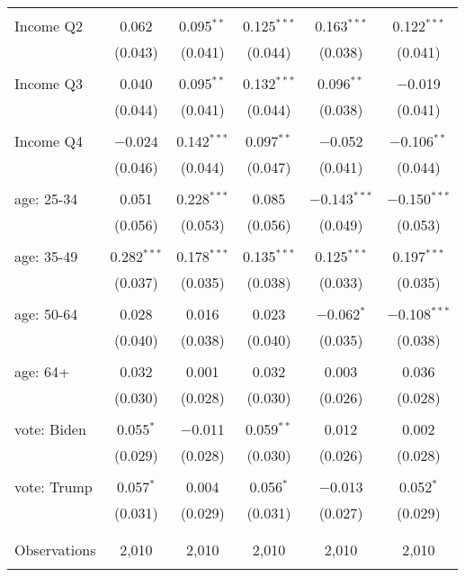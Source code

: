 \begin{tabular}{@{\extracolsep{5pt}}lccccc}
  & & & & & \\ 
 Income Q2 & 0.062 & 0.095$^{**}$ & 0.125$^{***}$ & 0.163$^{***}$ & 0.122$^{***}$ \\ 
  & (0.043) & (0.041) & (0.044) & (0.038) & (0.041) \\ 
  & & & & & \\ 
 Income Q3 & 0.040 & 0.095$^{**}$ & 0.132$^{***}$ & 0.096$^{**}$ & $-$0.019 \\ 
  & (0.044) & (0.041) & (0.044) & (0.038) & (0.041) \\ 
  & & & & & \\ 
 Income Q4 & $-$0.024 & 0.142$^{***}$ & 0.097$^{**}$ & $-$0.052 & $-$0.106$^{**}$ \\ 
  & (0.046) & (0.044) & (0.047) & (0.041) & (0.044) \\ 
  & & & & & \\ 
 age: 25-34 & 0.051 & 0.228$^{***}$ & 0.085 & $-$0.143$^{***}$ & $-$0.150$^{***}$ \\ 
  & (0.056) & (0.053) & (0.056) & (0.049) & (0.053) \\ 
  & & & & & \\ 
 age: 35-49 & 0.282$^{***}$ & 0.178$^{***}$ & 0.135$^{***}$ & 0.125$^{***}$ & 0.197$^{***}$ \\ 
  & (0.037) & (0.035) & (0.038) & (0.033) & (0.035) \\ 
  & & & & & \\ 
 age: 50-64 & 0.028 & 0.016 & 0.023 & $-$0.062$^{*}$ & $-$0.108$^{***}$ \\ 
  & (0.040) & (0.038) & (0.040) & (0.035) & (0.038) \\ 
  & & & & & \\ 
 age: 64+ & 0.032 & 0.001 & 0.032 & 0.003 & 0.036 \\ 
  & (0.030) & (0.028) & (0.030) & (0.026) & (0.028) \\ 
  & & & & & \\ 
 vote: Biden & 0.055$^{*}$ & $-$0.011 & 0.059$^{**}$ & 0.012 & 0.002 \\ 
  & (0.029) & (0.028) & (0.030) & (0.026) & (0.028) \\ 
  & & & & & \\ 
 vote: Trump & 0.057$^{*}$ & 0.004 & 0.056$^{*}$ & $-$0.013 & 0.052$^{*}$ \\ 
  & (0.031) & (0.029) & (0.031) & (0.027) & (0.029) \\ 
  & & & & & \\ 
\hline \\[-1.8ex] 

Observations & 2,010 & 2,010 & 2,010 & 2,010 & 2,010 \\ 
\hline 
\hline \\[-1.8ex] 
\end{tabular} 